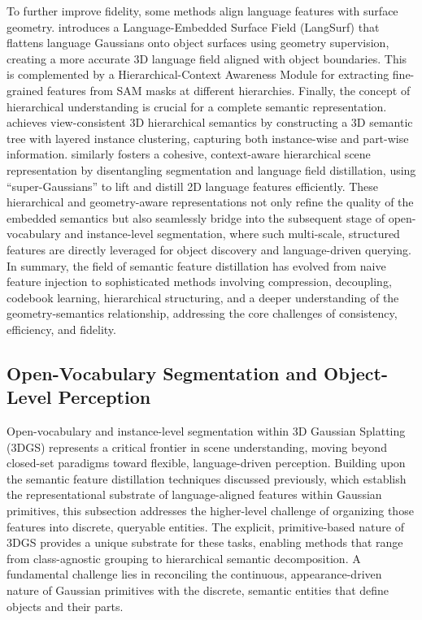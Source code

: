 \documentclass[11pt]{article}
\begin{document}
To further improve fidelity, some methods align language features with surface geometry. \cite{ref508} introduces a Language-Embedded Surface Field (LangSurf) that flattens language Gaussians onto object surfaces using geometry supervision, creating a more accurate 3D language field aligned with object boundaries. This is complemented by a Hierarchical-Context Awareness Module for extracting fine-grained features from SAM masks at different hierarchies. Finally, the concept of hierarchical understanding is crucial for a complete semantic representation. \cite{ref509} achieves view-consistent 3D hierarchical semantics by constructing a 3D semantic tree with layered instance clustering, capturing both instance-wise and part-wise information. \cite{ref510} similarly fosters a cohesive, context-aware hierarchical scene representation by disentangling segmentation and language field distillation, using ``super-Gaussians'' to lift and distill 2D language features efficiently. These hierarchical and geometry-aware representations not only refine the quality of the embedded semantics but also seamlessly bridge into the subsequent stage of open-vocabulary and instance-level segmentation, where such multi-scale, structured features are directly leveraged for object discovery and language-driven querying. In summary, the field of semantic feature distillation has evolved from naive feature injection to sophisticated methods involving compression, decoupling, codebook learning, hierarchical structuring, and a deeper understanding of the geometry-semantics relationship, addressing the core challenges of consistency, efficiency, and fidelity.

\subsection{Open-Vocabulary Segmentation and Object-Level Perception}

Open-vocabulary and instance-level segmentation within 3D Gaussian Splatting (3DGS) represents a critical frontier in scene understanding, moving beyond closed-set paradigms toward flexible, language-driven perception. Building upon the semantic feature distillation techniques discussed previously, which establish the representational substrate of language-aligned features within Gaussian primitives, this subsection addresses the higher-level challenge of organizing those features into discrete, queryable entities. The explicit, primitive-based nature of 3DGS provides a unique substrate for these tasks, enabling methods that range from class-agnostic grouping to hierarchical semantic decomposition. A fundamental challenge lies in reconciling the continuous, appearance-driven nature of Gaussian primitives with the discrete, semantic entities that define objects and their parts.
\end{document}
